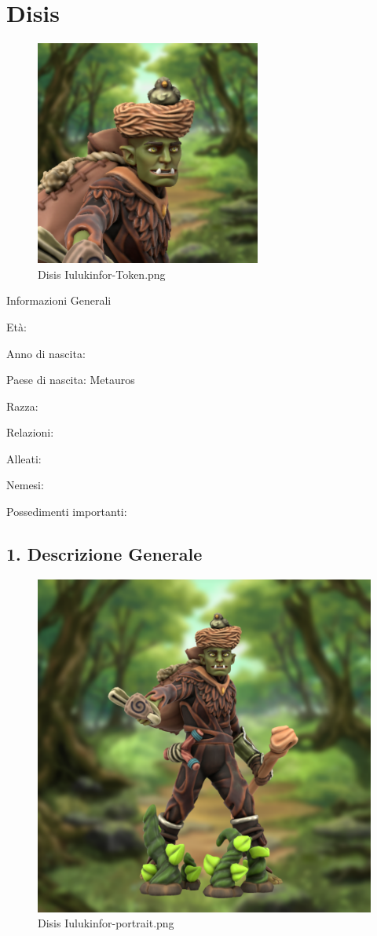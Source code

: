 \section{Disis}


\begin{figure}
\centering
\includegraphics{Disis_Iulukinfor-Token.png}
\caption{Disis Iulukinfor-Token.png}
\end{figure}

Informazioni Generali

Età:

Anno di nascita:

Paese di nascita: Metauros

Razza:

Relazioni:

Alleati:

Nemesi:

Possedimenti importanti:


\subsection{1. Descrizione Generale}\label{descrizione-generale}


\begin{figure}
\centering
\includegraphics{Disis_Iulukinfor-portrait.png}
\caption{Disis Iulukinfor-portrait.png}
\end{figure}

